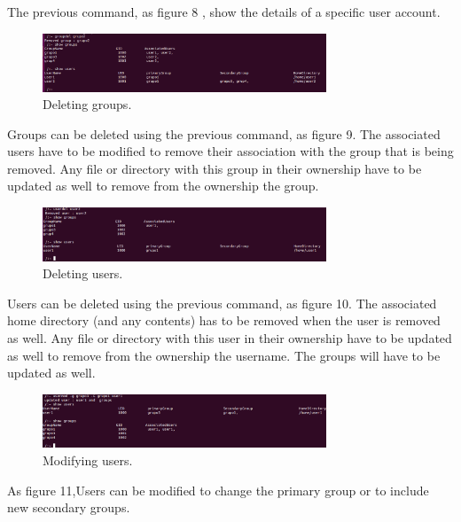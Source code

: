 \documentclass{aes2e}
\begin{document}
\begin{itemize}
The previous command, as figure 8 ,  show the details of a specific user account.\newline

\begin{figure}[ht]
\centering
\includegraphics[width=20pc]{delgroup.eps}
\caption{Deleting groups.}
\end{figure}

Groups can be deleted using the previous command, as figure 9. The associated users have to be modified to remove their association with the group that is being removed. Any file or directory with this group in their ownership have to be updated as well to remove from the ownership the group.\newline

\begin{figure}[ht]
\centering
\includegraphics[width=20pc]{deluser.eps}
\caption{Deleting users.}
\end{figure}

Users can be deleted using the previous command, as figure 10. The associated home directory (and any contents) has to be removed when the user is removed as well. Any file or directory with this user in their ownership have to be updated as well to remove from the ownership the username. The groups will have to be updated as well.

\begin{figure}[ht]
\centering
\includegraphics[width=20pc]{usermod.png}
\caption{Modifying users.}
\end{figure}
As figure 11,Users can be modified to change the primary group or to include new secondary groups.\newline


\end{itemize}
\end{document}
